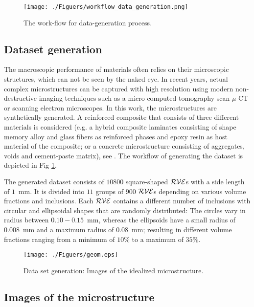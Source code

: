 \documentclass[final,3p,times]{elsarticle}
\begin{document}
\begin{figure}[t]
	\centering 
	\texttt{[image: ./Figuers/workflow\_data\_generation.png]} 
	\caption{The work-flow for data-generation process.}
	\label{data_generation}
\end{figure}

\subsection{Dataset generation}

The macroscopic performance of materials often relies on their microscopic structures, which can not be seen by the naked eye. In recent years, actual complex microstructures can be captured with high resolution using modern non-destructive imaging techniques such as a micro-computed tomography scan $\mu$-CT or scanning electron microscopes. In this work, the microstructures are synthetically generated. A reinforced composite that consists of three different materials is considered (e.g. a hybrid composite laminates consisting of shape memory alloy and glass fibers as reinforced phases and epoxy resin as host material of the composite; or a concrete microstructure consisting of aggregates, voids and cement-paste matrix), see \citet{noii2022probabilistic,segurado2002numerical,wessels2020neural}. The workflow of generating the dataset is depicted in Fig \ref{data_generation}.

The generated dataset consists of $10800$ square-shaped $\cal{RVE}$s with a side length of $1$~mm. It is divided into $11$ groups of $900$ $\cal{RVE}$s depending on various volume fractions and inclusions. Each $\cal{RVE}$ contains a different number of inclusions with circular and ellipsoidal shapes that are randomly distributed: The circles vary in radius between $0.10-0.15$~mm, whereas the ellipsoids have a small radius of $0.008$~mm and a maximum radius of $0.08$~mm; resulting in different volume fractions ranging from a minimum of $10\%$ to a maximum of $35\%$.

\begin{figure}[b]
	\centering 
	\texttt{[image: ./Figuers/geom.eps]} 
	\caption{Data set generation: Images of the idealized microstructure.}
	\label{idealized_microstructure}
\end{figure}


\subsection{Images of the microstructure}
\end{document}
